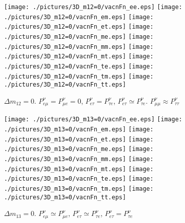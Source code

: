\begin{figure}[!ht]
\vspace*{-0.75cm}
\texttt{[image: ./pictures/3D\_m12=0/vacnFn\_ee.eps]}\hspace*{-2mm}
\texttt{[image: ./pictures/3D\_m12=0/vacnFn\_em.eps]}\hspace*{-2mm}
\texttt{[image: ./pictures/3D\_m12=0/vacnFn\_et.eps]}\hspace*{-2mm}
\texttt{[image: ./pictures/3D\_m12=0/vacnFn\_me.eps]}\hspace*{-2mm}
\texttt{[image: ./pictures/3D\_m12=0/vacnFn\_mm.eps]}\hspace*{-2mm}
\texttt{[image: ./pictures/3D\_m12=0/vacnFn\_mt.eps]}\hspace*{-2mm}
\texttt{[image: ./pictures/3D\_m12=0/vacnFn\_te.eps]}\hspace*{-2mm}
\texttt{[image: ./pictures/3D\_m12=0/vacnFn\_tm.eps]}\hspace*{-2mm}
\texttt{[image: ./pictures/3D\_m12=0/vacnFn\_tt.eps]}
\caption{$\Delta{m_{12}}=0$. $P^{\nu}_{e\mu}=P^{\nu}_{\mu{}e}=0$, $P^{\nu}_{e\tau}=P^{\nu}_{\tau{}e}$, $P^{\nu}_{e\tau}\simeq{}P^{\nu}_{\tau{}e}$. $P^{\nu}_{\mu\mu}\approx{}P^{\nu}_{\tau\tau}$}
\label{vacn3DFn_m12=0}
\end{figure}
\begin{figure}[!ht]
\vspace*{-0.75cm}
\texttt{[image: ./pictures/3D\_m13=0/vacnFn\_ee.eps]}\hspace*{-2mm}
\texttt{[image: ./pictures/3D\_m13=0/vacnFn\_em.eps]}\hspace*{-2mm}
\texttt{[image: ./pictures/3D\_m13=0/vacnFn\_et.eps]}\hspace*{-2mm}
\texttt{[image: ./pictures/3D\_m13=0/vacnFn\_me.eps]}\hspace*{-2mm}
\texttt{[image: ./pictures/3D\_m13=0/vacnFn\_mm.eps]}\hspace*{-2mm}
\texttt{[image: ./pictures/3D\_m13=0/vacnFn\_mt.eps]}\hspace*{-2mm}
\texttt{[image: ./pictures/3D\_m13=0/vacnFn\_te.eps]}\hspace*{-2mm}
\texttt{[image: ./pictures/3D\_m13=0/vacnFn\_tm.eps]}\hspace*{-2mm}
\texttt{[image: ./pictures/3D\_m13=0/vacnFn\_tt.eps]}
\caption{$\Delta{m_{13}}=0$. $P^{\nu}_{e\mu}\simeq{}P^{\nu}_{\mu{}e}$, $P^{\nu}_{e\tau}\simeq{}P^{\nu}_{\tau{}e}$, $P^{\nu}_{e\tau}=P^{\nu}_{\tau{}e}$}
\label{vacn3DFn_m13=0}
\end{figure}

